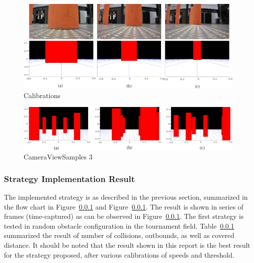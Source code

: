 \begin{figure}
\includegraphics[width=0.9\linewidth]{Figures/Calibrations.png}
\centering
\caption{Calibrations}
\label{f:Calibrations}
\end{figure} 

\begin{figure}
\includegraphics[width=0.9\linewidth]{Figures/CameraViewSamples_3.png}
\centering
\caption{CameraViewSamples 3}
\label{f:CameraViewSamples}
\end{figure} 

\subsubsection{Strategy Implementation Result}
The implemented strategy is as described in the previous section, summarized in the flow chart in Figure~\ref{} and Figure~\ref{}. The result is shown in series of frames (time-captured) as can be observed in Figure~\ref{}. The first strategy is tested in random obstacle configuration in the tournament field. Table~\ref{} summarized the result of number of collisions, outbounds, as well as covered distance. It should be noted that the result shown in this report is the best result for the strategy proposed, after various calibrations of speeds and threshold. 

